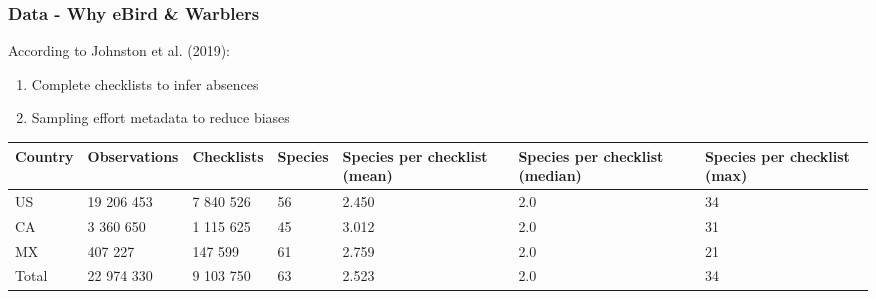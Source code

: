 \documentclass[10pt]{beamer}
\renewcommand{\arraystretch}{1.25}
\begin{document}
\begin{frame}
  \frametitle{Data - Why eBird \& Warblers}
  According to Johnston et al. (2019):
  \begin{enumerate}
    \item Complete checklists to infer absences
    \item Sampling effort metadata to reduce biases
  \end{enumerate}
  \begin{adjustbox}{center, caption={Structure of the Warblers (\textit{Parulidae}) occurrence data for North America as checklists in the eBird Dataset}, float=table}
    \begin{table}
      \scriptsize
      \def\arraystretch{1.5}
      \hspace{}\begin{tabularx}{1.1\textwidth}{X X X X X X X}
      \hline
      Country & Observations & Checklists & Species & Species per checklist (mean) & Species per checklist (median) & Species per checklist (max) \\
      \hline
      US    & 19 206 453 & 7 840 526 & 56 & 2.450 & 2.0 & 34 \\
      CA    & 3 360 650  & 1 115 625 & 45 & 3.012 & 2.0 & 31 \\
      MX    & 407 227    & 147 599   & 61 & 2.759 & 2.0 & 21 \\
      Total & 22 974 330 & 9 103 750 & 63 & 2.523 & 2.0 & 34 \\
      \hline
    \end{tabularx}
  \end{table}
 \end{adjustbox}
\end{frame}
\end{document}
